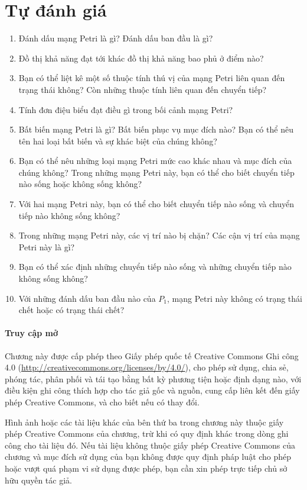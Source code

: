 \section{Tự đánh giá}
\begin{enumerate}
\item Đánh dấu mạng Petri là gì? Đánh dấu ban đầu là gì?
\item Đồ thị khả năng đạt tới khác đồ thị khả năng bao phủ ở điểm nào?
\item Bạn có thể liệt kê một số thuộc tính thú vị của mạng Petri liên quan đến trạng thái không? Còn những thuộc tính liên quan đến chuyển tiếp?
\item Tính đơn điệu biểu đạt điều gì trong bối cảnh mạng Petri?
\item Bất biến mạng Petri là gì? Bất biến phục vụ mục đích nào? Bạn có thể nêu tên hai loại bất biến và sự khác biệt của chúng không?
\item Bạn có thể nêu những loại mạng Petri mức cao khác nhau và mục đích của chúng không? Trong những mạng Petri này, bạn có thể cho biết chuyển tiếp nào sống hoặc không sống không?
\item Với hai mạng Petri này, bạn có thể cho biết chuyển tiếp nào sống và chuyển tiếp nào không sống không?
\item Trong những mạng Petri này, các vị trí nào bị chặn? Các cận vị trí của mạng Petri này là gì?
\item Bạn có thể xác định những chuyển tiếp nào sống và những chuyển tiếp nào không sống không?
\item Với những đánh dấu ban đầu nào của $P_1$, mạng Petri này không có trạng thái chết hoặc có trạng thái chết?
\end{enumerate}

\paragraph{Truy cập mở}
Chương này được cấp phép theo Giấy phép quốc tế Creative Commons Ghi công 4.0 (\url{http://creativecommons.org/licenses/by/4.0/}), cho phép sử dụng, chia sẻ, phóng tác, phân phối và tái tạo bằng bất kỳ phương tiện hoặc định dạng nào, với điều kiện ghi công thích hợp cho tác giả gốc và nguồn, cung cấp liên kết đến giấy phép Creative Commons, và cho biết nếu có thay đổi.

Hình ảnh hoặc các tài liệu khác của bên thứ ba trong chương này thuộc giấy phép Creative Commons của chương, trừ khi có quy định khác trong dòng ghi công cho tài liệu đó. Nếu tài liệu không thuộc giấy phép Creative Commons của chương và mục đích sử dụng của bạn không được quy định pháp luật cho phép hoặc vượt quá phạm vi sử dụng được phép, bạn cần xin phép trực tiếp chủ sở hữu quyền tác giả.
